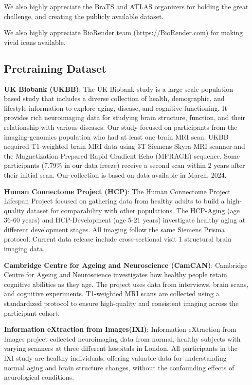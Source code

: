 \documentclass[pdflatex,sn-nature]{sn-jnl}%
\theoremstyle{thmstyleone}%
\theoremstyle{thmstyletwo}%
\theoremstyle{thmstylethree}%
\begin{document}
\begin{appendices}
We also highly appreciate the BraTS and ATLAS organizers for holding the great challenge, and creating the publicly available dataset.

We also highly appreciate BioRender team (https://BioRender.com) for making vivid icons available.

\subsection{Pretraining Dataset}
\label{sec:pretraining_data}
\textbf{UK Biobank (UKBB)}\citep{sudlow2015uk}: The UK Biobank study is a large-scale population-based study that includes a diverse collection of health, demographic, and lifestyle information to explore aging, disease, and cognitive functioning. It provides rich neuroimaging data for studying brain structure, function, and their relationship with various diseases. Our study focused on participants from the imaging-genomics population who had at least one brain MRI scan. UKBB acquired T1-weighted brain MRI data using 3T Siemens Skyra MRI scanner and the Magnetization Prepared Rapid Gradient Echo (MPRAGE) sequence. Some participants (7.79\% in our data freeze) receive a second scan within 2 years after their initial scan. Our collection is based on data available in March, 2024. 

\textbf{Human Connectome Project (HCP)}\citep{harms2018extending, bookheimer2019lifespan}: The Human Connectome Project Lifespan Project focused on gathering data from healthy adults to build a high-quality dataset for comparability with other populations. The HCP-Aging (age 36-60 years) and HCP-Development (age 5-21 years) investigate healthy aging at different development stages. All imaging follow the same Siemens Prisma protocol. Current data release include cross-sectional visit 1 structural brain imaging data.

\textbf{Cambridge Centre for Ageing and Neuroscience (CamCAN)}\citep{taylor2017cambridge}: Cambridge Centre for Ageing and Neuroscience investigates how healthy people retain cognitive abilities as they age. The project uses data from interviews, brain scans, and cognitive experiments. T1-weighted MRI scans are collected using a standardized protocol to ensure high-quality and consistent imaging across the participant cohort.

\textbf{Information eXtraction from Images(IXI)}\citep{rowland2004information}:  Information eXtraction from Images project collected neuroimaging data from normal, healthy subjects with varying scanners at three different hospitals in London. All participants in the IXI study are healthy individuals, offering valuable data for understanding normal aging and brain structure changes, without the confounding effects of neurological conditions.


\end{appendices}
\end{document}
